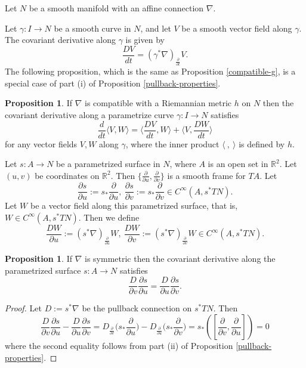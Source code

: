 \documentclass{amsart}
\numberwithin{equation}{section}
\newcommand{\bR}{\mathbb{R}}
\theoremstyle{definition}
\theoremstyle{theorem}
\newtheorem{proposition}[definition]{Proposition}
\begin{document}
Let $N$ be a smooth manifold with an affine connection $\nabla$.

Let $\gamma : I \to N$ be a smooth curve in $N$,  and let $V$ be a smooth vector field along $\gamma$. 
The covariant derivative along $\gamma$ is given by   
\[
\frac{DV}{dt} = (\gamma^* \nabla)_{\frac{\partial}{\partial t}}V.
\]
The following proposition, which is the same as Proposition \ref{compatible-g}, 
is a special case of part (i) of Proposition \ref{pullback-properties}.
\begin{proposition} 
If $\nabla$ is compatible with a Riemannian metric $h$ on $N$ then the covariant derivative
along a parametrize curve $\gamma:I\to N$ satisfies
\[
\frac{d}{dt} \langle V, W \rangle = \langle \frac{DV}{dt}, W \rangle + \langle V, \frac{DW}{dt} \rangle
\]
for any vector fields $V,W$ along $\gamma$, where the inner product $\langle \ , \ \rangle$ is defined by $h$.
\end{proposition}

Let $s : A \to N$ be a parametrized surface in $N$,
where $A$ is an open set in $\bR^2$. Let $(u,v)$ be coordinates on $\bR^2$.
Then $\{ \frac{\partial}{\partial u}, \frac{\partial}{\partial v}\}$ is a smooth frame for $TA$. 
Let 
\[
\frac{\partial s}{\partial u} := s_* \frac{\partial}{\partial u},\
\frac{\partial s}{\partial v}:= s_*\frac{\partial}{\partial v} \in C^\infty(A,s^*TN).
\]
Let $W$ be a vector field along this parametrized surface, that is, $W \in C^\infty(A, s^*TN)$. Then we define 
\[
\frac{DW}{\partial u}  := (s^*\nabla)_{\frac{\partial}{\partial u}}W,\ 
\frac{DW}{\partial v} := (s^*\nabla)_{\frac{\partial}{\partial v}} W \in C^\infty(A,s^*TN). 
\]
\begin{proposition} If $\nabla$ is symmetric then the covariant derivative along the parametrized surface $s:A\to N$
satisfies 
\[
\frac{D}{\partial v} \frac{\partial s}{\partial u} = \frac{D}{\partial u} \frac{\partial s}{\partial v}.
\]
\end{proposition}
\begin{proof} Let $D:=s^*\nabla$ be the pullback connection on $s^*TN$. Then
$$
\frac{D}{\partial v} \frac{\partial s}{\partial u}- \frac{D}{\partial u} \frac{\partial s}{\partial v}
=D_{\frac{\partial}{\partial v}} \big( s_*\frac{\partial}{\partial u}\big) -
D_{\frac{\partial}{\partial u}} \big(s_*\frac{\partial}{\partial v}\big) = s_*([ \frac{\partial}{\partial v},\frac{\partial}{\partial u}])=0
$$
where the second equality follows from part (ii) of Proposition \ref{pullback-properties}.
\end{proof}
\end{document}
